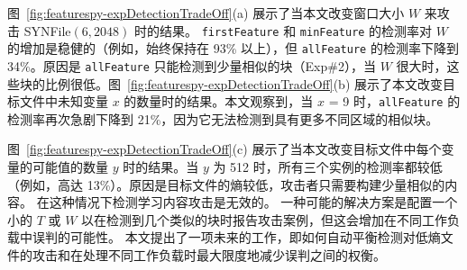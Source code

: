 图~\ref{fig:featurespy-expDetectionTradeOff}(a) 展示了当本文改变窗口大小 $W$ 来攻击 SYNFile$(6, 2048)$ 时的结果。 {\tt firstFeature} 和 {\tt minFeature} 的检测率对 $W$ 的增加是稳健的（例如，始终保持在 93\% 以上），但 {\tt allFeature} 的检测率下降到 34\%。原因是 {\tt allFeature} 只能检测到少量相似的块（Exp\#2），当 $W$ 很大时，这些块的比例很低。图~\ref{fig:featurespy-expDetectionTradeOff}(b) 展示了本文改变目标文件中未知变量 $x$ 的数量时的结果。本文观察到，当 $x$ = 9 时，{\tt allFeature} 的检测率再次急剧下降到 21\%，因为它无法检测到具有更多不同区域的相似块。


图~\ref{fig:featurespy-expDetectionTradeOff}(c) 展示了当本文改变目标文件中每个变量的可能值的数量 $y$ 时的结果。当 $y$ 为 512 时，所有三个实例的检测率都较低（例如，高达 13\%）。原因是目标文件的熵较低，攻击者只需要构建少量相似的内容。 \sysnameF 在这种情况下检测学习内容攻击是无效的。 一种可能的解决方案是配置一个小的 $T$ 或 $W$ 以在检测到几个类似的块时报告攻击案例，但这会增加在不同工作负载中误判的可能性。 本文提出了一项未来的工作，即如何自动平衡检测对低熵文件的攻击和在处理不同工作负载时最大限度地减少误判之间的权衡。